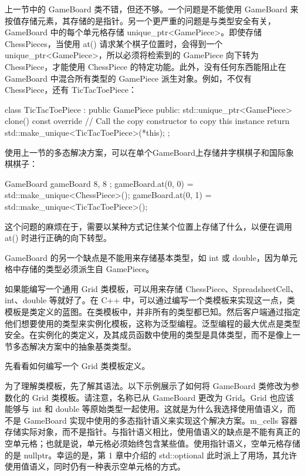 
上一节中的 GameBoard 类不错，但还不够。一个问题是不能使用 GameBoard 来按值存储元素，其存储的是指针。另一个更严重的问题是与类型安全有关，GameBoard 中的每个单元格存储 unique\_ptr<GamePiece>。即使存储 ChessPieces，当使用 at() 请求某个棋子位置时，会得到一个 unique\_ptr<GamePiece>，所以必须将检索到的 GamePiece 向下转为 ChessPiece，才能使用 ChessPiece 的特定功能。此外，没有任何东西能阻止在 GameBoard 中混合所有类型的 GamePiece 派生对象。例如，不仅有 ChessPiece，还有 TicTacToePiece：

\begin{cpp}
class TicTacToePiece : public GamePiece
{
    public:
        std::unique_ptr<GamePiece> clone() const override
        {
            // Call the copy constructor to copy this instance
            return std::make_unique<TicTacToePiece>(*this);
        }
};
\end{cpp}

使用上一节的多态解决方案，可以在单个GameBoard上存储井字棋棋子和国际象棋棋子：

\begin{cpp}
GameBoard gameBoard { 8, 8 };
gameBoard.at(0, 0) = std::make_unique<ChessPiece>();
gameBoard.at(0, 1) = std::make_unique<TicTacToePiece>();
\end{cpp}

这个问题的麻烦在于，需要以某种方式记住某个位置上存储了什么，以便在调用 at() 时进行正确的向下转型。

GameBoard 的另一个缺点是不能用来存储基本类型，如 int 或 double，因为单元格中存储的类型必须派生自 GamePiece。

如果能编写一个通用 Grid 类模板，可以用来存储 ChessPiece、SpreadsheetCell、int、double 等就好了。在 C++ 中，可以通过编写一个类模板来实现这一点，类模板是类定义的蓝图。在类模板中，并非所有的类型都已知。然后客户端通过指定他们想要使用的类型来实例化模板，这称为泛型编程。泛型编程的最大优点是类型安全。在实例化的类定义，及其成员函数中使用的类型是具体类型，而不是像上一节多态解决方案中的抽象基类类型。

先看看如何编写一个 Grid 类模板定义。


为了理解类模板，先了解其语法。以下示例展示了如何将 GameBoard 类修改为参数化的 Grid 类模板。请注意，名称已从 GameBoard 更改为 Grid。Grid 也应该能够与 int 和 double 等原始类型一起使用。这就是为什么我选择使用值语义，而不是 GameBoard 实现中使用的多态指针语义来实现这个解决方案。m\_cells 容器存储实际对象，而不是指针。与指针语义相比，使用值语义的缺点是不能有真正的空单元格；也就是说，单元格必须始终包含某些值。使用指针语义，空单元格存储的是 nullptr。幸运的是，第 1 章中介绍的 std::optional 此时派上了用场，其允许使用值语义，同时仍有一种表示空单元格的方式。

